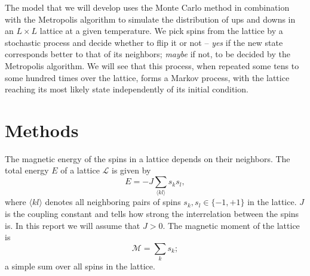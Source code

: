 \documentclass[]{article}
\begin{document}
The model that we will develop uses the Monte Carlo method in combination with the Metropolis algorithm to simulate the distribution of ups and downs in an $L \times L$ lattice at a given temperature. We pick spins from the lattice by a stochastic process and decide whether to flip it or not -- \textit{yes} if the new state corresponds better to that of its neighbors; \textit{maybe} if not, to be decided by the Metropolis algorithm. We will see that this process, when repeated some tens to some hundred times over the lattice, forms a Markov process, with the lattice reaching its most likely state independently of its initial condition.



\section{Methods} \label{methods}


The magnetic energy of the spins in a lattice depends on their neighbors. The total energy $E$ of a lattice $\mathcal{L}$ is given by
\begin{equation} \label{eq:e-sum}
	E = -J \sum_{\langle kl \rangle} s_k s_l,
\end{equation}
where $\langle kl \rangle$ denotes all neighboring pairs of spins $s_k, s_l \in \{ -1, +1\}$ in the lattice. $J$ is the coupling constant and tells how strong the interrelation between the spins is. In this report we will assume that $J > 0$. The magnetic moment of the lattice is
\begin{equation} \label{eq:m-sum}
	\mathcal{M} = \sum_{k} s_k;
\end{equation}
a simple sum over all spins in the lattice.
\end{document}
